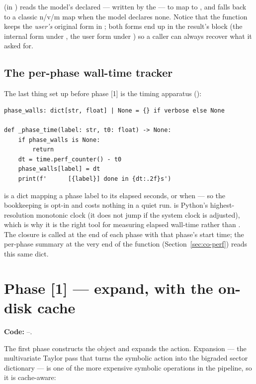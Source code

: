  (in ) reads the
model's declared  --- written by the
 --- to map  to , and falls back
to a classic n/v/m map when the model declares none. Notice that the function
keeps the \emph{user's} original form in ; both forms
end up in the result's  block (the internal form under
, the user form under ) so a
caller can always recover what it asked for.

\subsection{The per-phase wall-time tracker}

The last thing set up before phase [1] is the timing apparatus
():

\begin{lstlisting}
phase_walls: dict[str, float] | None = {} if verbose else None

def _phase_time(label: str, t0: float) -> None:
    if phase_walls is None:
        return
    dt = time.perf_counter() - t0
    phase_walls[label] = dt
    print(f'      [{label}] done in {dt:.2f}s')
\end{lstlisting}

 is a dict mapping a phase label to its elapsed seconds, or
 when  --- so the bookkeeping is opt-in and costs
nothing in a quiet run.  is Python's highest-resolution
monotonic clock (it does not jump if the system clock is adjusted), which is why
it is the right tool for measuring elapsed wall-time rather than .
The closure  is called at the end of each phase
with that phase's start time; the per-phase summary at the very end of the
function (Section~\ref{sec:co-perf}) reads this same dict.

\section{Phase [1] --- expand, with the on-disk cache}\label{sec:co-expand}

\textbf{Code:} --.

The first phase constructs the  object and expands the action.
Expansion --- the multivariate Taylor pass that turns the symbolic action into
the bigraded sector dictionary --- is one of the more expensive symbolic
operations in the pipeline, so it is cache-aware:

